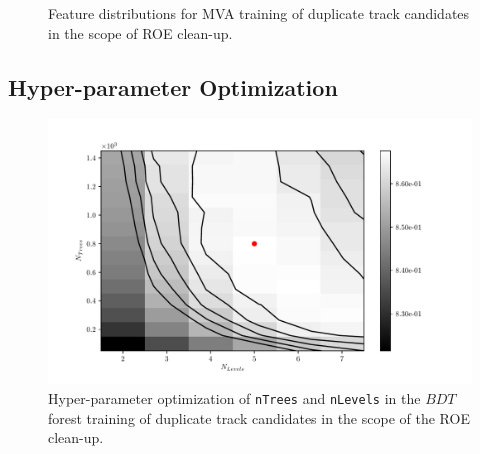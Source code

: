 \begin{figure}[H]
\caption{Feature distributions for MVA training of duplicate track candidates in the scope of ROE clean-up.}
\end{figure}


\subsection{Hyper-parameter Optimization}

\begin{figure}[H]
\centering
\captionsetup{width=0.8\linewidth}
\includegraphics[width=\linewidth]{fig/addendums/curl_hpo}
\caption{Hyper-parameter optimization of \texttt{\footnotesize nTrees} and \texttt{\footnotesize nLevels} in the $BDT$ forest training of duplicate track candidates in the scope of the ROE clean-up.}
\end{figure}

